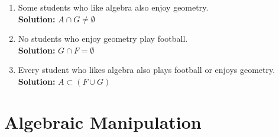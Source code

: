 \documentclass{article}
\begin{document}
\begin{enumerate}
\begin{enumerate}[leftmargin = 0.5cm, label = (\alph*), rightmargin = 0.2cm]
    \item Some students who like algebra also enjoy geometry. \\ \textbf{Solution:} \( A \cap G \neq \emptyset \)
    \item No students who enjoy geometry play football. \\ \textbf{Solution:} \( G \cap F = \emptyset \)
    \item Every student who likes algebra also plays football or enjoys geometry. \\ \textbf{Solution:} \( A \subset (F \cup G) \)
    \end{enumerate}
\end{enumerate}

\section{Algebraic Manipulation}
\end{document}
